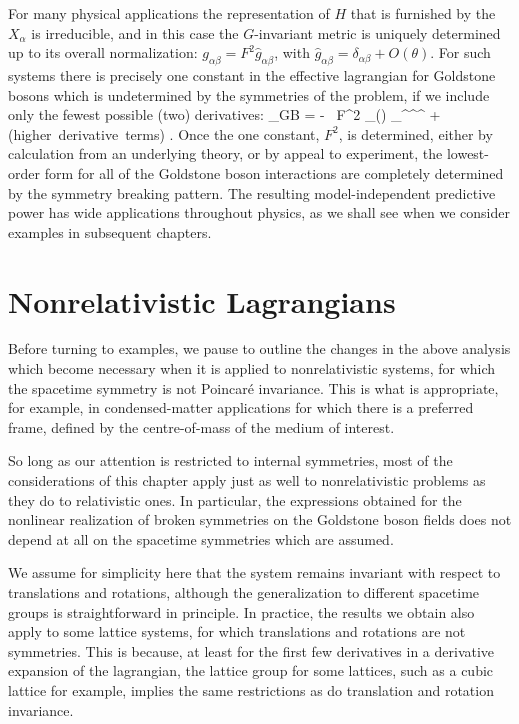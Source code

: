 \documentclass[12pt]{report}
\begin{document}
For many physical applications the representation of $H$
that is furnished by the $X_\alpha$ is irreducible, and in
this case the $G$-invariant metric is uniquely determined
up to its overall normalization: $g_{\alpha\beta} = F^2
\hat{g}_{\alpha\beta}$, with $\hat{g}_{\alpha\beta} =
\delta_{\alpha\beta} + O(\theta)$. For such systems there
is precisely one constant in the effective lagrangian for
Goldstone bosons which is undetermined by the symmetries of
the problem, if we include only the fewest possible (two) 
derivatives:
%
\eq
\label{genlowdterm}
\Scl_{\sss GB} = - \, {F^2 } \;
_{\alpha\beta}(\theta) \;
\partial_\mu \theta^\alpha \partial^\mu \theta^\beta 
+ \hbox{(higher derivative terms)} .
\eeq
%
Once the one constant, $F^2$, is determined, either by
calculation from an underlying theory, or by appeal to
experiment, the lowest-order form for all of the Goldstone
boson interactions are completely determined by the
symmetry breaking pattern. The resulting model-independent
predictive power has wide applications throughout physics,
as we shall see when we consider examples in subsequent
chapters.

\section{Nonrelativistic Lagrangians}

Before turning to examples, we pause to outline the changes
in the above analysis which become necessary when it is
applied to nonrelativistic systems, for which the spacetime
symmetry is not Poincar\'e invariance. This is what is
appropriate, for example, in condensed-matter applications
for which there is a preferred frame, defined by the
centre-of-mass of the medium of interest.

So long as our attention is restricted to internal
symmetries, most of the considerations of this chapter
apply just as well to nonrelativistic problems as they do
to relativistic ones. In particular, the expressions
obtained for the nonlinear realization of broken symmetries
on the Goldstone boson fields does not depend at all on the
spacetime symmetries which are assumed.

We assume for simplicity here that the system remains
invariant with respect to translations and rotations,
although the generalization to different spacetime groups
is straightforward in principle. In practice, the results
we obtain also apply to some lattice systems, for which
translations and rotations are not symmetries. This is
because, at least for the first few derivatives in a
derivative expansion of the lagrangian, the lattice group
for some lattices, such as a cubic lattice for example,
implies the same restrictions as do translation and
rotation invariance.
\end{document}
